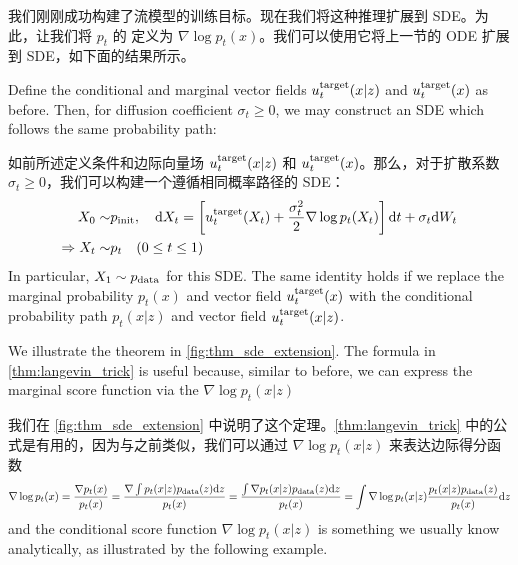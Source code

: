 我们刚刚成功构建了流模型的训练目标。现在我们将这种推理扩展到 SDE。为此，让我们将 $p_t$ 的  定义为 $\nabla\log p_t(x)$。我们可以使用它将上一节的 ODE 扩展到 SDE，如下面的结果所示。
\begin{theorem}
\label{thm:langevin_trick}
Define the conditional and marginal vector fields $u^{\text{target}}_t(x|z)$ and $u^{\text{target}}_t(x)$ as before. Then, for diffusion coefficient $\sigma_t\geq 0$, we may construct an SDE which follows the same probability path:

如前所述定义条件和边际向量场 $u^{\text{target}}_t(x|z)$ 和 $u^{\text{target}}_t(x)$。那么，对于扩散系数 $\sigma_t\geq 0$，我们可以构建一个遵循相同概率路径的 SDE：
\begin{align}
\label{eq:sde_extension}
    X_0\sim&p_{\rm{init}},\quad \mathrm{d} X_t =\left[u^{\text{target}}_t(X_t)+\frac{\sigma_t^2}{2}\nabla\log p_t(X_t)\right]\mathrm{d} t +\sigma_t\mathrm{d} W_t\\
    \label{eq:marginal_ode_follows_marginal_path_sde}
    \Rightarrow X_t\sim& p_t\quad (0\leq t\leq 1)
\end{align}
In particular, $X_1\sim p_{\rm{data}}$ for this SDE. The same identity holds if we replace the marginal probability $p_t(x)$ and vector field $u^{\text{target}}_t(x)$ with the conditional probability path $p_t(x|z)$ and vector field $u^{\text{target}}_t(x|z)$.
\end{theorem}
We illustrate the theorem in \cref{fig:thm_sde_extension}. The formula in \cref{thm:langevin_trick} is useful because, similar to before, we can express the marginal score function via the  $\nabla\log p_t(x|z)$

我们在 \cref{fig:thm_sde_extension} 中说明了这个定理。\cref{thm:langevin_trick} 中的公式是有用的，因为与之前类似，我们可以通过  $\nabla\log p_t(x|z)$ 来表达边际得分函数
\begin{align}
\label{e:marginal_score}
\nabla\log p_t(x) = \frac{\nabla p_t(x)}{p_t(x)}
=\frac{\nabla \int p_t(x|z)p_{\rm{data}}(z)\mathrm{d} z}{p_t(x)}
=\frac{\int \nabla p_t(x|z)p_{\rm{data}}(z)\mathrm{d} z}{p_t(x)}
=\int \nabla \log p_t(x|z)\frac{ p_t(x|z)p_{\rm{data}}(z)}{p_t(x)}\mathrm{d} z
\end{align}
and the conditional score function $\nabla \log p_t(x|z)$ is something we usually know analytically, as illustrated by the following example.

